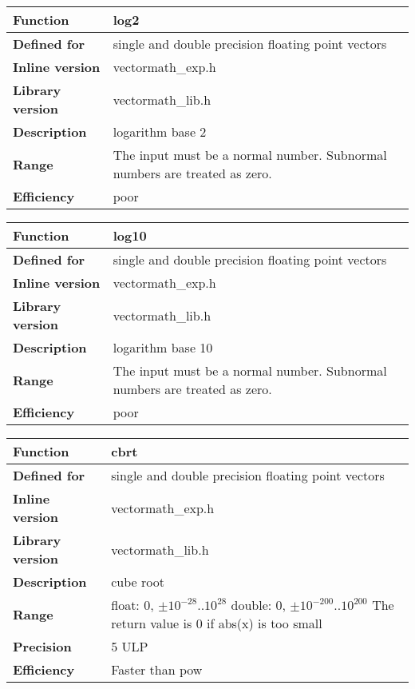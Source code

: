 \documentclass[vcl_manual.tex]{subfiles}
\begin{document}
\begin{tabular}{|p{30mm}|p{120mm}|}
\hline
\bfseries Function & log2 \\ \hline
\bfseries Defined for & single and double precision floating point vectors \\ \hline
\bfseries Inline version & vectormath\_exp.h \\ \hline
\bfseries Library version & vectormath\_lib.h \\ \hline
\bfseries Description & logarithm base 2  \\ \hline
\bfseries Range & The input must be a normal number. Subnormal numbers are treated as zero. \\ \hline
\bfseries Efficiency & poor \\ \hline
\end{tabular}


\begin{tabular}{|p{30mm}|p{120mm}|}
\hline
\bfseries Function & log10 \\ \hline
\bfseries Defined for & single and double precision floating point vectors \\ \hline
\bfseries Inline version & vectormath\_exp.h \\ \hline
\bfseries Library version & vectormath\_lib.h \\ \hline
\bfseries Description & logarithm base 10  \\ \hline
\bfseries Range & The input must be a normal number. Subnormal numbers are treated as zero. \\ \hline
\bfseries Efficiency & poor \\ \hline
\end{tabular}

\label{cbrt}
\begin{tabular}{|p{30mm}|p{120mm}|}
\hline
\bfseries Function & cbrt \\ \hline
\bfseries Defined for & single and double precision floating point vectors \\ \hline
\bfseries Inline version & vectormath\_exp.h \\ \hline
\bfseries Library version & vectormath\_lib.h \\ \hline
\bfseries Description & cube root  \\ \hline
\bfseries Range & float: 0, $\pm 10^{-28} ..{}  10^{28}$ \newline
                  double: 0, $\pm 10^{-200} ..{}  10^{200}$ \newline
                  The return value is 0 if abs(x) is too small \\ \hline
\bfseries Precision & 5 ULP \\ \hline                  
\bfseries Efficiency & Faster than pow \\ \hline
\end{tabular}
\end{document}

